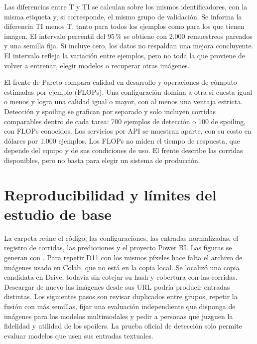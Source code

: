 Las diferencias entre T y TI se calculan sobre los mismos identificadores,
con la misma etiqueta y, si corresponde, el mismo grupo de validación. Se
informa la diferencia TI menos T, tanto para todos los ejemplos como para
los que tienen imagen. El intervalo percentil del 95\,\% se obtiene con
2.000 remuestreos pareados y una semilla fija. Si incluye cero, los datos
no respaldan una mejora concluyente. El intervalo refleja la variación entre
ejemplos, pero no toda la que proviene de volver a entrenar, elegir modelos
o recuperar otras imágenes.

El frente de Pareto compara calidad en desarrollo y operaciones de cómputo
estimadas por ejemplo (FLOPs). Una configuración domina a otra si cuesta
igual o menos y logra una calidad igual o mayor, con al menos una ventaja
estricta. Detección y spoiling se grafican por separado y solo incluyen
corridas comparables dentro de cada tarea: 700 ejemplos de detección o 100
de spoiling, con FLOPs conocidos. Los
servicios por API se muestran aparte, con su costo en dólares por 1.000
ejemplos. Los FLOPs no miden el tiempo de respuesta, que depende del equipo
y de sus condiciones de uso. El frente describe las corridas disponibles,
pero no basta para elegir un sistema de producción.

\section{Reproducibilidad y límites del estudio de base}

La carpeta  reúne el código, las configuraciones, las
entradas normalizadas, el registro de corridas, las predicciones y el
proyecto Power BI. Las figuras se generan con
. Para repetir D11 con los
mismos píxeles hace falta el archivo de imágenes usado en Colab, que no está
en la copia local. Se localizó una copia candidata en Drive, todavía sin
cotejar su hash y cobertura con las corridas. Descargar de nuevo las imágenes
desde sus URL podría producir entradas distintas. Los siguientes pasos son revisar duplicados entre grupos, repetir
la fusión con más semillas, fijar una evaluación independiente que disponga
de imágenes para los modelos multimodales y pedir a personas que juzguen la
fidelidad y utilidad de los spoilers. La prueba oficial de detección solo
permite evaluar modelos que usen sus entradas textuales.
